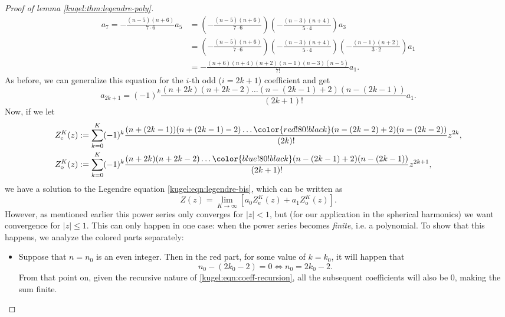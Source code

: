 \begin{proof}[Proof of lemma \ref{kugel:thm:legendre-poly}]
\begin{align*}
    a_{7} = -\frac{(n-5)(n+6)}{7\cdot 6} a_5
      &= \left( -\frac{(n-5)(n+6)}{7 \cdot 6} \right)
         \left( -\frac{(n-3)(n+4)}{5 \cdot 4} \right) a_3 \\
      &= \left( -\frac{(n-5)(n+6)}{7 \cdot 6} \right)
         \left( -\frac{(n-3)(n+4)}{5 \cdot 4} \right)
         \left( -\frac{(n-1)(n+2)}{3 \cdot 2} \right) a_1 \\
      &= -\frac{(n+6)(n+4)(n+2)(n-1)(n-3)(n-5)}{7!} a_1.
  \end{align*}
  As before, we can generalize this equation for the $i$-th odd ($i = 2k+1$)
  coefficient and get
  \begin{equation*}
    a_{2k+1} = (-1)^k \frac{(n + 2k)(n+2k-2)
      \hdots (n-(2k-1)+2)(n-(2k-1))}{(2k+1)!} a_1.
  \end{equation*}
  Now, if we let
  \begin{align*}
    Z_\text{e}^K(z) &:=
      \sum_{k=0}^K(-1)^k \frac{
        (n+(2k-1))(n+(2k-1)-2) \hdots
        \color{red!80!black}(n-(2k-2)+2)(n-(2k-2))
      }{(2k)!} z^{2k}, \\
    Z_\text{o}^K(z) &:=
      \sum_{k=0}^K(-1)^k \frac{
        (n + 2k)(n+2k-2)\hdots \color{blue!80!black} (n-(2k-1)+2)(n-(2k-1))
      }{(2k+1)!} z^{2k+1},
  \end{align*}
  we have a solution to the Legendre equation \eqref{kugel:eqn:legendre-bis},
  which can be written as
  \begin{equation} \label{kugel:eqn:legendre-powerseries}
    Z(z) = \lim_{K \to \infty} \left[
      a_0 Z_\text{e}^K(z) + a_1 Z_\text{o}^K(z)
    \right].
  \end{equation}
  However, as mentioned earlier this power series only converges for $|z| < 1$,
  but (for our application in the spherical harmonics) we want convergence for
  $|z| \leq 1$. This can only happen in one case: when the power series becomes
  \emph{finite}, i.e. a polynomial. To show that this happens, we analyze the
  colored parts separately:
  \begin{itemize}
    \item[\textcolor{red}{\textbullet}]
      Suppose that $n = n_0$ is an even integer. Then in the red part, for some
      value of $k=k_0$, it will happen that
      \begin{equation*}
        n_0-(2k_0-2)=0
        \iff
        n_0 = 2 k_0 - 2.
      \end{equation*}
      From that point on, given the recursive nature of
      \eqref{kugel:eqn:coeff-recursion}, all the subsequent coefficients will
      also be 0, making the sum finite.


\end{itemize}
\end{proof}
